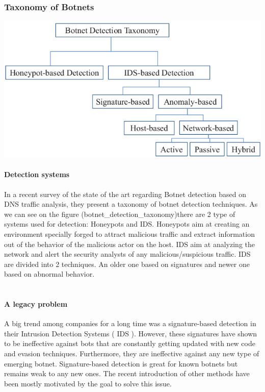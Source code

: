 \subsubsection{Taxonomy of Botnets}

\includegraphics[scale=.8]{img/Botnet-detection-taxonomy.png}
\paragraph{Detection systems}In a recent survey\cite{survey1} of the state of the art regarding Botnet detection based on DNS traffic analysis\cite{survey}, they present a taxonomy of botnet detection techniques. As we can see on the figure (botnet\_detection\_taxonomy)there are 2 type of systems used for detection: Honeypots and IDS. Honeypots aim at creating an environment specially forged to attract malicious traffic and extract information out of the behavior of the malicious actor on the host. IDS aim at analyzing the network and alert the security analysts of any malicious/suspicious traffic. IDS are divided into 2 techniques. An older one based on signatures and newer one based on abnormal behavior.\\\\
\paragraph{A legacy problem} A big trend among companies for a long time was a signature-based detection in their Intrusion Detection Systems ( IDS )\cite{bot-ml}. However, these signatures have shown to be ineffective against bots that are constantly getting updated with new code and evasion techniques. Furthermore, they are ineffective against any new type of emerging botnet. Signature-based detection is great for known botnets but remains weak to any new ones\cite{snort}. The recent introduction of other methods have been mostly motivated by the goal to solve this issue.
\\\\

